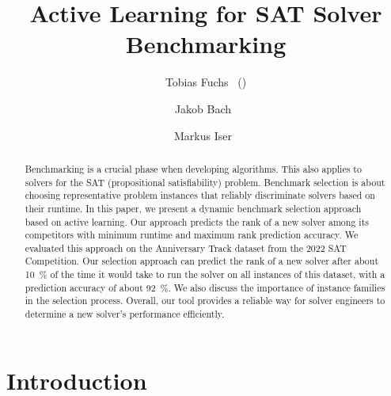 \documentclass[runningheads]{llncs}
\begin{document}
\title{Active Learning for SAT Solver Benchmarking}

\author{
  Tobias Fuchs~ (\Letter) \and
  Jakob Bach~ \and
  Markus Iser~
}



\maketitle

\begin{abstract}
  Benchmarking is a crucial phase when developing algorithms.
  This also applies to solvers for the SAT (propositional satisfiability) problem.
  Benchmark selection is about choosing representative problem instances that reliably discriminate solvers based on their runtime.
  In this paper, we present a dynamic benchmark selection approach based on active learning.
  Our approach predicts the rank of a new solver among its competitors with minimum runtime and maximum rank prediction accuracy.
  We evaluated this approach on the Anniversary Track dataset from the 2022 SAT Competition.
  Our selection approach can predict the rank of a new solver after about \SI{10}{\%} of the time it would take to run the solver on all instances of this dataset, with a prediction accuracy of about \SI{92}{\%}. 
  We also discuss the importance of instance families in the selection process. 
  Overall, our tool provides a reliable way for solver engineers to determine a new solver's performance efficiently.

\end{abstract}


\section{Introduction}
\label{sec:intro}
\end{document}
